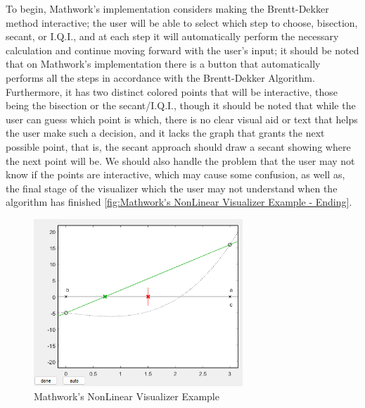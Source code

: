 To begin, Mathwork's implementation considers making the Brentt-Dekker method interactive; the user will be able to select which step to choose, bisection, secant, or I.Q.I., and at each step it will automatically perform the necessary calculation and continue moving forward with the user's input; it should be noted that on Mathwork's implementation there is a button that automatically performs all the steps in accordance with the Brentt-Dekker Algorithm. Furthermore, it has two distinct colored points that will be interactive, those being the bisection or the secant/I.Q.I., though it should be noted that while the user can guess which point is which, there is no clear visual aid or text that helps the user make such a decision, and it lacks the graph that grants the next possible point, that is, the secant approach should draw a secant showing where the next point will be. We should also handle the problem that the user may not know if the points are interactive, which may cause some confusion, as well as, the final stage of the visualizer  which the user may not understand when the algorithm has finished \ref{fig:Mathwork's NonLinear Visualizer Example - Ending}.

\begin{figure}[H]
    \centering
    \includegraphics[width=0.7\textwidth]{Include/Images/Thesis/Development/Visualizers/NON LINEAR VISUALIZER/Mathworks.NonLinear.Ex1.png}
    \caption{Mathwork's NonLinear Visualizer Example}
    \label{fig:Mathwork's NonLinear Visualizer Example}
\end{figure}

